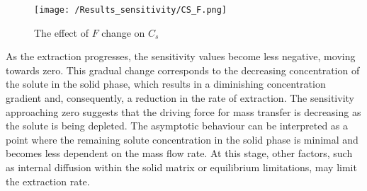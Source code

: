 \documentclass[../Article_Sensitivity_Analsysis.tex]{subfiles}
\begin{document}
	\begin{figure}[h!]
		\centering
		\texttt{[image: /Results\_sensitivity/CS\_F.png]}
		\caption{The effect of $F$ change on $C_s$}
		\label{fig:Sensitivty_F_CS}
	\end{figure}
	
	As the extraction progresses, the sensitivity values become less negative, moving towards zero. This gradual change corresponds to the decreasing concentration of the solute in the solid phase, which results in a diminishing concentration gradient and, consequently, a reduction in the rate of extraction. The sensitivity approaching zero suggests that the driving force for mass transfer is decreasing as the solute is being depleted. The asymptotic behaviour can be interpreted as a point where the remaining solute concentration in the solid phase is minimal and becomes less dependent on the mass flow rate. At this stage, other factors, such as internal diffusion within the solid matrix or equilibrium limitations, may limit the extraction rate.
	
	
	
	
\end{document}
